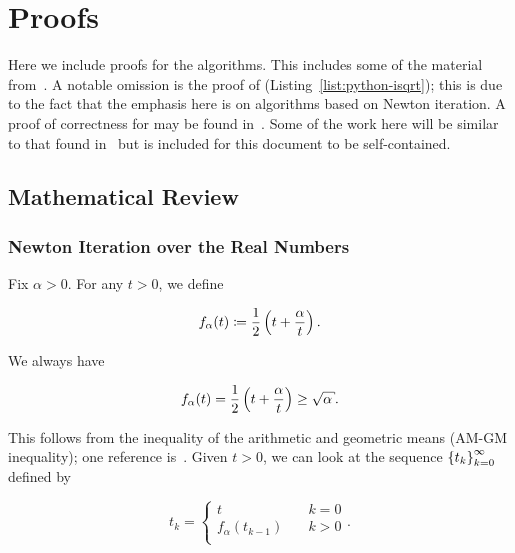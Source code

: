 \section{Proofs}
\label{app:proofs}

Here we include proofs for the algorithms.
This includes some of the material from~\cite[Appendix B]{EfficientIsqrt}.
A notable omission is the proof of
\python{} (Listing~\ref{list:python-isqrt});
this is due to the fact that the emphasis here is on algorithms
based on Newton iteration.
A proof of correctness for \python{}
may be found in~\cite[Appendix C]{EfficientIsqrt}.
Some of the work here will be similar to that found
in~\cite[Appendix A]{EfficientIsqrt}
but is included for this document to be self-contained.

\subsection{Mathematical Review}

\subsubsection{Newton Iteration over the Real Numbers}

Fix $\alpha>0$.
For any $t>0$, we define

\begin{equation}
    f_{\alpha}(t) \coloneqq{} \frac{1}{2}\left( t + \frac{\alpha}{t} \right).
\end{equation}

\noindent
We always have

\begin{equation}
    f_{\alpha}(t) = \frac{1}{2}\parens{t + \frac{\alpha}{t}} \ge \sqrt{\alpha}.
\end{equation}

\noindent
This follows from the inequality of the arithmetic and geometric means
(AM-GM inequality); one reference is~\cite{CSMaster}.
Given $t>0$, we can look at the sequence $\left\{ t_{k} \right\}_{k=0}^{\infty}$
defined by

\begin{equation}
    t_{k} = \begin{cases}
        t \quad &k=0 \\
        f_{\alpha}(t_{k-1}) \quad &k>0 \\
    \end{cases}.
    \label{eq:app:proof:newton_seq}
\end{equation}

